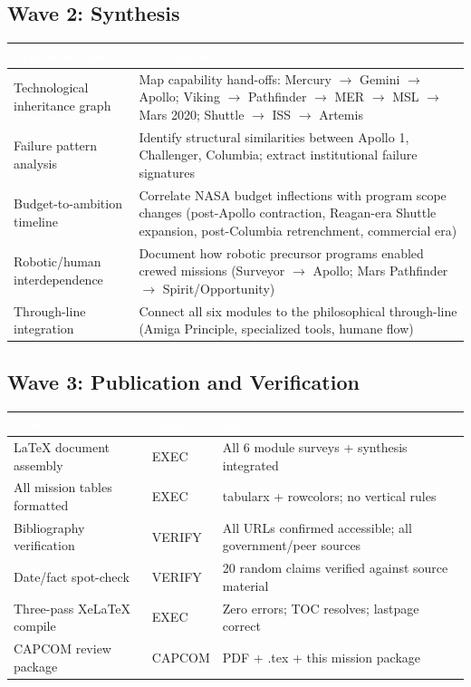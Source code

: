 \documentclass[11pt,letterpaper]{article}
\newcommand{\tableheader}[1]{\textbf{\sffamily\textcolor{white}{#1}}}
\begin{document}
\subsection{Wave 2: Synthesis}

\begin{center}
\begin{tabularx}{\textwidth}{L{3.5cm}X}
\toprule
{}
\tableheader{Synthesis Task} & \tableheader{Description} \\
\midrule
Technological inheritance graph & Map capability hand-offs: Mercury $\to$ Gemini $\to$ Apollo; Viking $\to$ Pathfinder $\to$ MER $\to$ MSL $\to$ Mars 2020; Shuttle $\to$ ISS $\to$ Artemis \\
Failure pattern analysis & Identify structural similarities between Apollo 1, Challenger, Columbia; extract institutional failure signatures \\
Budget-to-ambition timeline & Correlate NASA budget inflections with program scope changes (post-Apollo contraction, Reagan-era Shuttle expansion, post-Columbia retrenchment, commercial era) \\
Robotic/human interdependence & Document how robotic precursor programs enabled crewed missions (Surveyor $\to$ Apollo; Mars Pathfinder $\to$ Spirit/Opportunity) \\
Through-line integration & Connect all six modules to the philosophical through-line (Amiga Principle, specialized tools, humane flow) \\
\bottomrule
\end{tabularx}
\end{center}

\subsection{Wave 3: Publication and Verification}

\begin{center}
\begin{tabularx}{\textwidth}{L{3.5cm}C{2cm}X}
\toprule
{}
\tableheader{Task} & \tableheader{Agent} & \tableheader{Gate} \\
\midrule
LaTeX document assembly & EXEC & All 6 module surveys + synthesis integrated \\
All mission tables formatted & EXEC & tabularx + rowcolors; no vertical rules \\
Bibliography verification & VERIFY & All URLs confirmed accessible; all government/peer sources \\
Date/fact spot-check & VERIFY & 20 random claims verified against source material \\
Three-pass XeLaTeX compile & EXEC & Zero errors; TOC resolves; lastpage correct \\
CAPCOM review package & CAPCOM & PDF + .tex + this mission package \\
\bottomrule
\end{tabularx}
\end{center}
\end{document}
